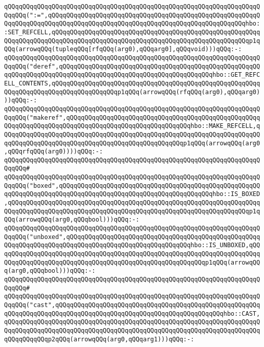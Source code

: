 \verb|qQQqqQQqqQQqqQQqqQQqqQQqqQQqqQQqqQQqqQQqqQQqqQQqqQQqqQQqqQQqqQQqqQQqqQQqqQQq(":=",qQQqqQQqqQQqqQQqqQQqqQQqqQQqqQQqqQQqqQQqqQQqqQQqqQQqqQQqqQQqqQQqqQQqqQQqqQQqqQQqqQQqqQQqqQQqqQQqqQQqqQQqqQQqqQQqqQQqqQQqqQQqhbo::SET_REFCELL,qQQqqQQqqQQqqQQqqQQqqQQqqQQqqQQqqQQqqQQqqQQqqQQqqQQqqQQqqQQqqQQqqQQqqQQqqQQqqQQqqQQqqQQqqQQqqQQqqQQqqQQqqQQqqQQqqQQqqQQqqQQqp1qQQq(arrowqQQq(tupleqQQq[rfqQQq(arg0),qQQqarg0],qQQqvoid)))qQQq:-:|\newline
\verb|qQQqqQQqqQQqqQQqqQQqqQQqqQQqqQQqqQQqqQQqqQQqqQQqqQQqqQQqqQQqqQQqqQQqqQQqqQQq("deref",qQQqqQQqqQQqqQQqqQQqqQQqqQQqqQQqqQQqqQQqqQQqqQQqqQQqqQQqqQQqqQQqqQQqqQQqqQQqqQQqqQQqqQQqqQQqqQQqqQQqqQQqqQQqqQQqhbo::GET_REFCELL_CONTENTS,qQQqqQQqqQQqqQQqqQQqqQQqqQQqqQQqqQQqqQQqqQQqqQQqqQQqqQQqqQQqqQQqqQQqqQQqqQQqqQQqqQQqqQQqp1qQQq(arrowqQQq(rfqQQq(arg0),qQQqarg0)))qQQq:-:|\newline
\verb|qQQqqQQqqQQqqQQqqQQqqQQqqQQqqQQqqQQqqQQqqQQqqQQqqQQqqQQqqQQqqQQqqQQqqQQqqQQq("makeref",qQQqqQQqqQQqqQQqqQQqqQQqqQQqqQQqqQQqqQQqqQQqqQQqqQQqqQQqqQQqqQQqqQQqqQQqqQQqqQQqqQQqqQQqqQQqqQQqqQQqqQQqhbo::MAKE_REFCELL,qQQqqQQqqQQqqQQqqQQqqQQqqQQqqQQqqQQqqQQqqQQqqQQqqQQqqQQqqQQqqQQqqQQqqQQqqQQqqQQqqQQqqQQqqQQqqQQqqQQqqQQqqQQqqQQqqQQqqQQqp1qQQq(arrowqQQq(arg0,qQQqrfqQQq(arg0))))qQQq:-:|\newline
\verb|qQQqqQQqqQQqqQQqqQQqqQQqqQQqqQQqqQQqqQQqqQQqqQQqqQQqqQQqqQQqqQQqqQQqqQQqqQQq#|\newline
\verb|qQQqqQQqqQQqqQQqqQQqqQQqqQQqqQQqqQQqqQQqqQQqqQQqqQQqqQQqqQQqqQQqqQQqqQQqqQQq("boxed",qQQqqQQqqQQqqQQqqQQqqQQqqQQqqQQqqQQqqQQqqQQqqQQqqQQqqQQqqQQqqQQqqQQqqQQqqQQqqQQqqQQqqQQqqQQqqQQqqQQqqQQqqQQqqQQqhbo::IS_BOXED,qQQqqQQqqQQqqQQqqQQqqQQqqQQqqQQqqQQqqQQqqQQqqQQqqQQqqQQqqQQqqQQqqQQqqQQqqQQqqQQqqQQqqQQqqQQqqQQqqQQqqQQqqQQqqQQqqQQqqQQqqQQqqQQqqQQqqQQqp1qQQq(arrowqQQq(arg0,qQQqbool)))qQQq:-:|\newline
\verb|qQQqqQQqqQQqqQQqqQQqqQQqqQQqqQQqqQQqqQQqqQQqqQQqqQQqqQQqqQQqqQQqqQQqqQQqqQQq("unboxed",qQQqqQQqqQQqqQQqqQQqqQQqqQQqqQQqqQQqqQQqqQQqqQQqqQQqqQQqqQQqqQQqqQQqqQQqqQQqqQQqqQQqqQQqqQQqqQQqqQQqqQQqhbo::IS_UNBOXED,qQQqqQQqqQQqqQQqqQQqqQQqqQQqqQQqqQQqqQQqqQQqqQQqqQQqqQQqqQQqqQQqqQQqqQQqqQQqqQQqqQQqqQQqqQQqqQQqqQQqqQQqqQQqqQQqqQQqqQQqqQQqqQQqp1qQQq(arrowqQQq(arg0,qQQqbool)))qQQq:-:|\newline
\verb|qQQqqQQqqQQqqQQqqQQqqQQqqQQqqQQqqQQqqQQqqQQqqQQqqQQqqQQqqQQqqQQqqQQqqQQqqQQq#|\newline
\verb|qQQqqQQqqQQqqQQqqQQqqQQqqQQqqQQqqQQqqQQqqQQqqQQqqQQqqQQqqQQqqQQqqQQqqQQqqQQq("cast",qQQqqQQqqQQqqQQqqQQqqQQqqQQqqQQqqQQqqQQqqQQqqQQqqQQqqQQqqQQqqQQqqQQqqQQqqQQqqQQqqQQqqQQqqQQqqQQqqQQqqQQqqQQqqQQqqQQqhbo::CAST,qQQqqQQqqQQqqQQqqQQqqQQqqQQqqQQqqQQqqQQqqQQqqQQqqQQqqQQqqQQqqQQqqQQqqQQqqQQqqQQqqQQqqQQqqQQqqQQqqQQqqQQqqQQqqQQqqQQqqQQqqQQqqQQqqQQqqQQqqQQqqQQqqQQqqQQqp2qQQq(arrowqQQq(arg0,qQQqarg1)))qQQq:-:|\newline
